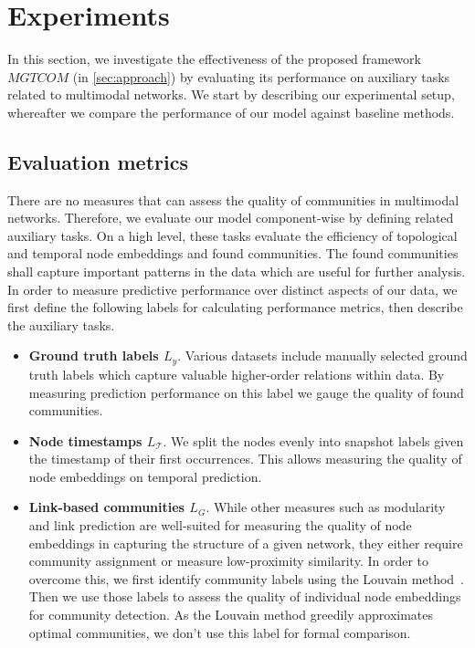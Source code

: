 \chapter{Experiments} \label{sec:experiments}
In this section, we investigate the effectiveness of the proposed framework $MGTCOM$ (in \cref{sec:approach}) by evaluating its performance on auxiliary tasks related to multimodal networks.
We start by describing our experimental setup, whereafter we compare the performance of our model against baseline methods.

\section{Evaluation metrics}
There are no measures that can assess the quality of communities in multimodal networks.
Therefore, we evaluate our model component-wise by defining related auxiliary tasks. 
On a high level, these tasks evaluate the efficiency of topological and temporal node embeddings and found communities. 
The found communities shall capture important patterns in the data which are useful for further analysis.
%
In order to measure predictive performance over distinct aspects of our data, we first define the following labels for calculating performance metrics, then describe the auxiliary tasks.

\begin{itemize}[leftmargin=*]
    \item \textbf{Ground truth labels $L_y$}. 
    Various datasets include manually selected ground truth labels which capture valuable higher-order relations within data. By measuring prediction performance on this label we gauge the quality of found communities.
    \item \textbf{Node timestamps $L_\mathcal{T}$}. 
    We split the nodes evenly into snapshot labels given the timestamp of their first occurrences. This allows measuring the quality of node embeddings on temporal prediction.  
    \item \textbf{Link-based communities $L_G$}. 
    While other measures such as modularity and link prediction are well-suited for measuring the quality of node embeddings in capturing the structure of a given network, they either require community assignment or measure low-proximity similarity.
    In order to overcome this, we first identify community labels using the Louvain method~\cite{blondelFastUnfoldingCommunities2008}. Then we use those labels to assess the quality of individual node embeddings for community detection. 
    As the Louvain method greedily approximates optimal communities, we don't use this label for formal comparison.
\end{itemize}


